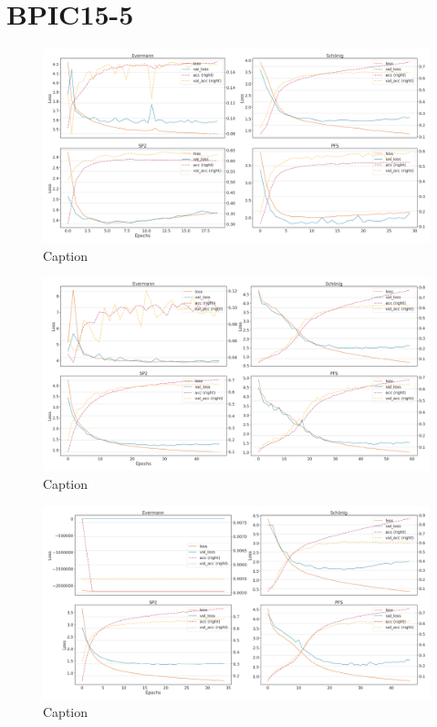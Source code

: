 \section{BPIC15-5}
\begin{figure}[!htb]
    \centering
    \includegraphics[width=\textwidth]{gfx/bpic2015_5/individual_loss_acc_curve.png}
    \caption{Caption}
    \label{fig:my_label}
\end{figure}
\begin{figure}[!htb]
    \centering
    \includegraphics[width=\textwidth]{gfx/bpic2015_5/grouped_loss_acc_curve.png}
    \caption{Caption}
    \label{fig:my_label}
\end{figure}
\begin{figure}[!htb]
    \centering
    \includegraphics[width=\textwidth]{gfx/bpic2015_5/padded_loss_acc_curve.png}
    \caption{Caption}
    \label{fig:my_label}
\end{figure}
